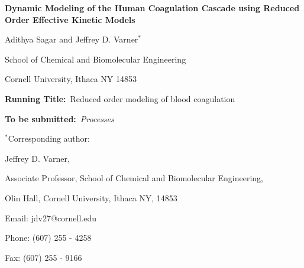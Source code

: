 \documentclass[12pt]{article}
\begin{document}
\begin{titlepage}
{\par\centering\textbf{\Large Dynamic Modeling of the Human Coagulation Cascade using Reduced Order Effective Kinetic Models}}
\vspace{0.05in}
{\par \centering \large{Adithya Sagar and Jeffrey D. Varner$^{*}$}}
\vspace{0.10in}
{\par \centering \large{School of Chemical and Biomolecular Engineering}}
{\par \centering \large{Cornell University, Ithaca NY 14853}}
\vspace{0.1in}
{\par \centering \textbf{Running Title:}~Reduced order modeling of blood coagulation}
\vspace{0.1in}
{\par \centering \textbf{To be submitted:}~\emph{Processes}}
\vspace{0.5in}
{\par \centering $^{*}$Corresponding author:}
{\par \centering Jeffrey D. Varner,}
{\par \centering Associate Professor, School of Chemical and Biomolecular Engineering,}
{\par {} Olin Hall, Cornell University, Ithaca NY, 14853} 
{\par \centering Email: jdv27@cornell.edu} 
{\par \centering Phone: (607) 255 - 4258}
{\par \centering Fax: (607) 255 - 9166}
\end{titlepage}
\date{}
\thispagestyle{empty}
\pagebreak
\end{document}

